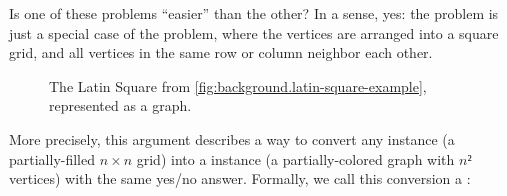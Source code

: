 Is one of these problems ``easier'' than the other?  In a sense, yes: the
 problem is just a special case of the  problem, where the vertices are arranged into a square grid, and all
vertices in the same row or column neighbor each other.

\begin{figure}[H]
  \begin{center}

    \caption{The Latin Square from \cref{fig:background.latin-square-example},
    represented as a graph.}

  \end{center}
\end{figure}

More precisely, this argument describes a way to convert any  instance (a partially-filled \(n×n\) grid) into a  instance (a partially-colored graph with \(n²\) vertices) with the
same yes/no answer.  Formally, we call this conversion a :

